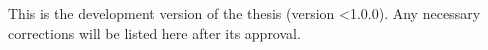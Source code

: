 

\clearpage



\imprimircapa


\imprimirfolhaderosto*


\begin{fichacatalografica}
 
\end{fichacatalografica}


\begin{errata}
This is the development version of the thesis (version \textless1.0.0).
Any necessary corrections will be listed here after its approval.
\end{errata}


